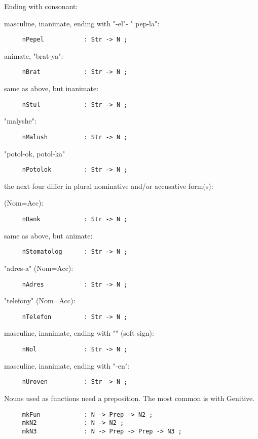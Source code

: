 \noindent Ending with consonant:

\noindent masculine, inanimate, ending with "-{\cyr el}"- "{\cyr
pep-la}":
\begin{verbatim}
     nPepel           : Str -> N ;
\end{verbatim}
animate, "{\cyr brat-\cyrsftsn{}ya}":
\begin{verbatim}
     nBrat            : Str -> N ;
\end{verbatim}
same as above, but inanimate:
\begin{verbatim}
     nStul            : Str -> N ;
\end{verbatim}
"{\cyr malyshe\cyrishrt{}}":
\begin{verbatim}
     nMalush          : Str -> N ;
\end{verbatim}
"{\cyr potol-ok, potol-ka}"
\begin{verbatim}
     nPotolok         : Str -> N ;
\end{verbatim}
the next four differ in plural nominative and/or accusative
form(s):

(Nom=Acc):
\begin{verbatim}
     nBank            : Str -> N ;
\end{verbatim}
same as above, but animate:
\begin{verbatim}
     nStomatolog      : Str -> N ;
\end{verbatim}
"{\cyr adres-a}" (Nom=Acc):
\begin{verbatim}
     nAdres           : Str -> N ;
\end{verbatim}
"{\cyr telefony}" (Nom=Acc):
\begin{verbatim}
     nTelefon         : Str -> N ;
\end{verbatim}
masculine, inanimate, ending with "{\cyr \cyrsftsn{}}" (soft
sign):
\begin{verbatim}
     nNol             : Str -> N ;
\end{verbatim}
masculine, inanimate, ending with "{\cyr -en\cyrsftsn{}}":
\begin{verbatim}
     nUroven          : Str -> N ;
\end{verbatim}

Nouns used as functions need a preposition. The most common is with Genitive.
\begin{verbatim}
     mkFun            : N -> Prep -> N2 ;
     mkN2             : N -> N2 ;
     mkN3             : N -> Prep -> Prep -> N3 ;
\end{verbatim}


